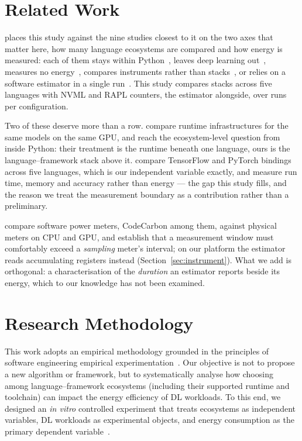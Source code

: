 \section{Related Work}
\label{sec:related}

 places this study against the nine studies closest to it
on the two axes that matter here, how many language ecosystems are compared and
how energy is measured: each of them stays within
Python~\citep{li2016evaluating,georgiou2022green,alizadeh2024energy}, leaves
deep learning out~\citep{pereira2021ranking,gordillo2024ranking,chattaraj2025rvspython},
measures no energy~\citep{li2024bindings}, compares instruments rather than
stacks~\citep{jay2023experimental}, or relies on a software estimator in a single
run~\citep{marini2025green}. This study compares \vEcosystems{} stacks across
five languages with NVML and RAPL counters, the estimator alongside, over
\vRepetitions{} runs per configuration.

Two of these deserve more than a row. \citet{alizadeh2024energy}
compare runtime infrastructures for the same models on the same GPU, and reach
the ecosystem-level question from inside Python: their treatment is the runtime
beneath one language, ours is the language--framework stack above it. 
\citet{li2024bindings} compare TensorFlow and PyTorch bindings across five
languages, which is our independent variable exactly, and measure run time,
memory and accuracy rather than energy --- the gap this study fills, and the
reason we treat the measurement boundary as a contribution rather than a
preliminary.

\citet{jay2023experimental} compare software power meters, CodeCarbon
among them, against physical meters on CPU and GPU, and establish that a
measurement window must comfortably exceed a \emph{sampling} meter's interval;
on our platform the estimator reads accumulating registers instead
(Section~\ref{sec:instrument}). What we add is orthogonal: a characterisation of
the \emph{duration} an estimator reports beside its energy, which to our
knowledge has not been examined.

\section{Research Methodology}
\label{sec:methodology}

This work adopts an empirical methodology grounded in the principles of software engineering empirical experimentation~\citep{feldt2010validity,ampatzoglou2019identifying,sjoberg2023construct,verdecchia2023threats}.
Our objective is not to propose a new algorithm or framework, but to systematically analyse how choosing among language--framework ecosystems (including their supported runtime and toolchain) can impact the energy efficiency of DL workloads.
To this end, we designed an \textit{in vitro} controlled experiment that treats ecosystems as independent variables, DL workloads as experimental objects, and energy consumption as the primary dependent variable~\citep{basili1994gqm,cook1979quasi,campbell1963experimental}.

